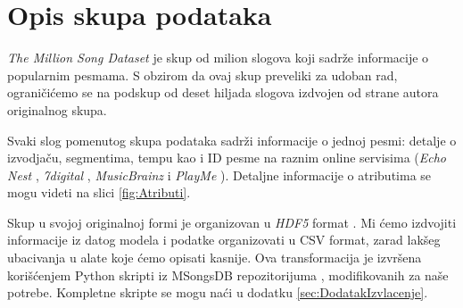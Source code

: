 \section{Opis skupa podataka}
\label{sec:Opis skupa podataka}

\emph{The Million Song Dataset} \cite{Dataset} je skup od milion slogova koji sadr\v{z}e informacije o popularnim pesmama. S obzirom da ovaj skup preveliki za udoban rad, ograni\v{c}i\'c{}emo se na podskup od deset hiljada slogova izdvojen od strane autora originalnog skupa.

Svaki slog pomenutog skupa podataka sadr\v{z}i informacije o jednoj pesmi: detalje o izvodja\v{c}u, segmentima, tempu kao i ID pesme na raznim online servisima (\emph{Echo Nest} \cite{EchoNest}, \emph{7digital} \cite{7digital},  \emph{MusicBrainz} \cite{MusicBrainz} i \emph{PlayMe} \cite{PlayMe}). Detaljne informacije o atributima se mogu videti na slici \ref{fig:Atributi}.

Skup u svojoj originalnoj formi je organizovan u \emph{HDF5} format \cite{HDF5}. Mi \'c{}emo izdvojiti informacije iz datog modela i podatke organizovati u CSV format, zarad lak\v{s}eg ubacivanja u alate koje \'c{}emo opisati kasnije. Ova transformacija je izvr\v{s}ena kori\v{s}\'c{}enjem Python skripti iz MSongsDB repozitorijuma \cite{MSongsDB}, modifikovanih za na\v{s}e potrebe. Kompletne skripte se mogu na\'c{}i u dodatku \ref{sec:DodatakIzvlacenje}.
